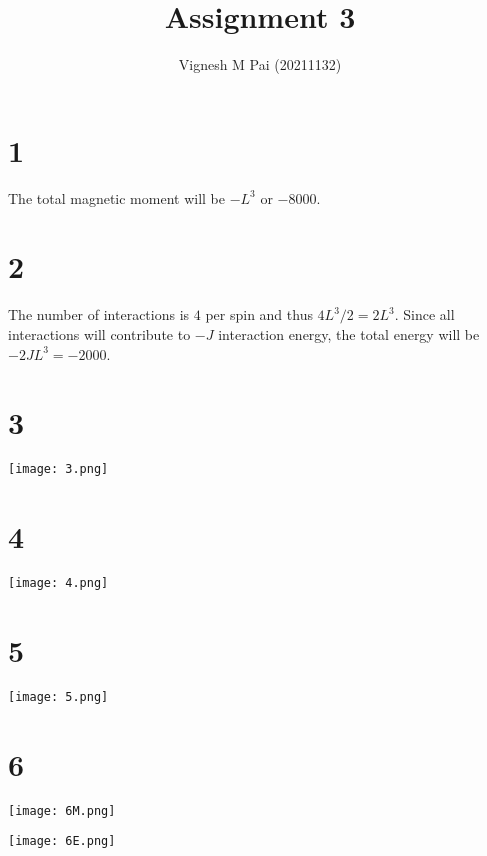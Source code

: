 \documentclass{article}
\title{Assignment 3}
\author{Vignesh M Pai (20211132)}
\date{}
\begin{document}
\maketitle

\section*{1}

The total magnetic moment will be $-L^3$ or $-8000$.

\section*{2}

The number of interactions is $4$ per spin and thus $4L^3 / 2 = 2 L^3$.
Since all interactions will contribute to $-J$ interaction energy, the total energy will be $-2 J L^3 = -2000$.

\section*{3}

\begin{center}
    \texttt{[image: 3.png]}
\end{center}

\section*{4}

\begin{center}
    \texttt{[image: 4.png]}
\end{center}

\section*{5}

\begin{center}
    \texttt{[image: 5.png]}
\end{center}

\section*{6}

\begin{center}
    \texttt{[image: 6M.png]}
\end{center}

\begin{center}
    \texttt{[image: 6E.png]}
\end{center}
\end{document}

